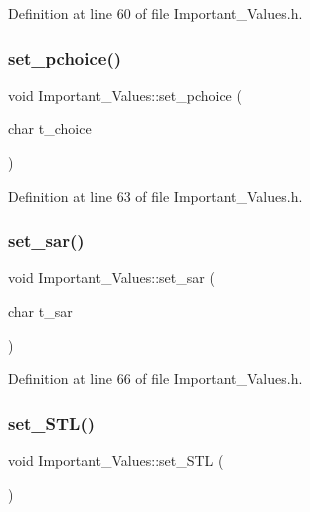 Definition at line 60 of file Important\+\_\+\+Values.\+h.

\mbox{\label{class_important___values_a0fe5f87794f90561d02374918f19adb6}} 
\subsubsection{\texorpdfstring{set\_pchoice()}{set\_pchoice()}\hspace{0.1cm}{\footnotesize\ttfamily [2/2]}}
{\footnotesize\ttfamily void Important\+\_\+\+Values\+::set\+\_\+pchoice (\begin{DoxyParamCaption}\item[{char}]{t\+\_\+choice }\end{DoxyParamCaption})\hspace{0.3cm}{\ttfamily [inline]}}



Definition at line 63 of file Important\+\_\+\+Values.\+h.

\mbox{\label{class_important___values_aa5c9258486a4c9a5cb001705b930f063}} 
\subsubsection{\texorpdfstring{set\_sar()}{set\_sar()}}
{\footnotesize\ttfamily void Important\+\_\+\+Values\+::set\+\_\+sar (\begin{DoxyParamCaption}\item[{char}]{t\+\_\+sar }\end{DoxyParamCaption})\hspace{0.3cm}{\ttfamily [inline]}}



Definition at line 66 of file Important\+\_\+\+Values.\+h.

\mbox{\label{class_important___values_af46179f6b6693ff2e1df7810278f6cbc}} 
\subsubsection{\texorpdfstring{set\_STL()}{set\_STL()}}
{\footnotesize\ttfamily void Important\+\_\+\+Values\+::set\+\_\+\+S\+TL (\begin{DoxyParamCaption}{ }\end{DoxyParamCaption})\hspace{0.3cm}{\ttfamily [inline]}}



